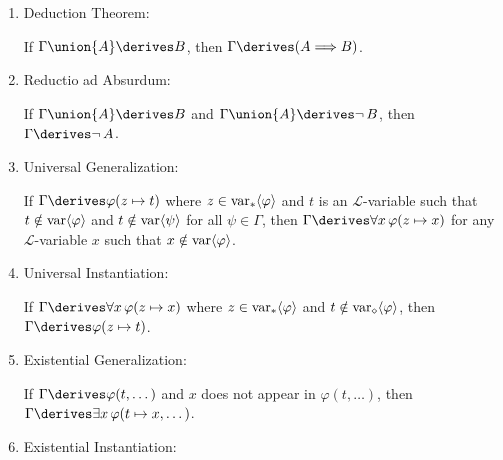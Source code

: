 \begin{enumerate}[topsep=2pt,itemsep=10pt,label=\textup{\texttt{(\arabic*)}}]
        If \( \Gamma \derives \mleft( A {\implies} C \mright) \), \( \Gamma \derives \mleft( B {\implies} D \mright) \), and
        \( \Gamma \derives \mleft( A \,\,{\lor}\,\, B \mright) \), then \( \Gamma \derives \mleft( C \,\,{\lor}\,\, D \mright) \).

    \item Deduction Theorem:  \label{rule-of-inference:deduction-theorem}

        If \( \Gamma \union \mleft\{ A \mright\} \derives B \), then \( \Gamma \derives \mleft( A {\implies} B \mright) \).

    \item Reductio ad Absurdum:  \label{rule-of-inference:reductio-ad-absurdum}

        If \( \Gamma \union \mleft\{ A \mright\} \derives B \) and \( \Gamma \union \mleft\{ A \mright\} \derives \lnot \, B \), then
        \( \Gamma \derives \lnot \, A \).

    \item Universal Generalization:  \label{rule-of-inference:universal-generalization}

        If \( \Gamma \derives \folfreevariablereplacement{\varphi}{z}{t} \) where \( z \in \operatorname{var}_{\ast} \langle\varphi\rangle \) and \( t \) is an \( \mathcal{L} \)-variable
        such that \( t \notin \operatorname{var} \langle\varphi\rangle \) and \( t \notin \operatorname{var} \langle\psi\rangle \) for all \( \psi \in \Gamma \),
        then \( \Gamma \derives \forall x \, \folfreevariablereplacement{\varphi}{z}{x} \) for any \( \mathcal{L} \)-variable \( x \) such that \( x \notin \operatorname{var} \langle\varphi\rangle \).

    \item Universal Instantiation:  \label{rule-of-inference:universal-instantiation}

        If \( \Gamma \derives \forall x \, \folfreevariablereplacement{\varphi}{z}{x} \) where \( z \in \operatorname{var}_{\ast} \langle\varphi\rangle \) and \( t \notin \operatorname{var}_{\diamond} \langle\varphi\rangle \),
        then \( \Gamma \derives \folfreevariablereplacement{\varphi}{z}{t} \).

    \item Existential Generalization:  \label{rule-of-inference:existential-generalization}

        If \( \Gamma \derives \varphi(t,\dots) \) and \( x \) does not appear in \( \varphi(t, \dots) \),
        then \( \Gamma \derives \exists x \, \varphi(t \mapsto x, \dots )\).

    \item Existential Instantiation:  \label{rule-of-inference:existential-instantiation}


\end{enumerate}
